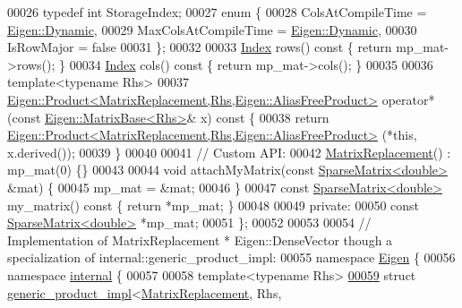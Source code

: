 \begin{DoxyCode}
00026   \textcolor{keyword}{typedef} \textcolor{keywordtype}{int} StorageIndex;
00027   \textcolor{keyword}{enum} \{
00028     ColsAtCompileTime = \hyperlink{namespace_eigen_ad81fa7195215a0ce30017dfac309f0b2}{Eigen::Dynamic},
00029     MaxColsAtCompileTime = \hyperlink{namespace_eigen_ad81fa7195215a0ce30017dfac309f0b2}{Eigen::Dynamic},
00030     IsRowMajor = \textcolor{keyword}{false}
00031   \};
00032 
00033   \hyperlink{group___core___module_a554f30542cc2316add4b1ea0a492ff02}{Index} rows()\textcolor{keyword}{ const }\{ \textcolor{keywordflow}{return} mp\_mat->rows(); \}
00034   \hyperlink{group___core___module_a554f30542cc2316add4b1ea0a492ff02}{Index} cols()\textcolor{keyword}{ const }\{ \textcolor{keywordflow}{return} mp\_mat->cols(); \}
00035 
00036   \textcolor{keyword}{template}<\textcolor{keyword}{typename} Rhs>
00037   \hyperlink{group___core___module_class_eigen_1_1_product}{Eigen::Product<MatrixReplacement,Rhs,Eigen::AliasFreeProduct>}
       operator*(\textcolor{keyword}{const} \hyperlink{group___core___module_class_eigen_1_1_matrix_base}{Eigen::MatrixBase<Rhs>}& x)\textcolor{keyword}{ const }\{
00038     \textcolor{keywordflow}{return} \hyperlink{group___core___module_class_eigen_1_1_product}{Eigen::Product<MatrixReplacement,Rhs,Eigen::AliasFreeProduct>}
      (*\textcolor{keyword}{this}, x.derived());
00039   \}
00040 
00041   \textcolor{comment}{// Custom API:}
00042   \hyperlink{class_matrix_replacement}{MatrixReplacement}() : mp\_mat(0) \{\}
00043 
00044   \textcolor{keywordtype}{void} attachMyMatrix(\textcolor{keyword}{const} \hyperlink{group___sparse_core___module_class_eigen_1_1_sparse_matrix}{SparseMatrix<double>} &mat) \{
00045     mp\_mat = &mat;
00046   \}
00047   \textcolor{keyword}{const} \hyperlink{group___sparse_core___module_class_eigen_1_1_sparse_matrix}{SparseMatrix<double>} my\_matrix()\textcolor{keyword}{ const }\{ \textcolor{keywordflow}{return} *mp\_mat; \}
00048 
00049 \textcolor{keyword}{private}:
00050   \textcolor{keyword}{const} \hyperlink{group___sparse_core___module_class_eigen_1_1_sparse_matrix}{SparseMatrix<double>} *mp\_mat;
00051 \};
00052 
00053 
00054 \textcolor{comment}{// Implementation of MatrixReplacement * Eigen::DenseVector though a specialization of
       internal::generic\_product\_impl:}
00055 \textcolor{keyword}{namespace }\hyperlink{namespace_eigen}{Eigen} \{
00056 \textcolor{keyword}{namespace }\hyperlink{namespaceinternal}{internal} \{
00057 
00058   \textcolor{keyword}{template}<\textcolor{keyword}{typename} Rhs>
\hyperlink{struct_eigen_1_1internal_1_1generic__product__impl_3_01_matrix_replacement_00_01_rhs_00_01_spars44a334490feb2d22de510ceb99173cfe}{00059}   \textcolor{keyword}{struct }\hyperlink{struct_eigen_1_1internal_1_1generic__product__impl}{generic\_product\_impl}<\hyperlink{class_matrix_replacement}{MatrixReplacement}, Rhs, 

\end{DoxyCode}
